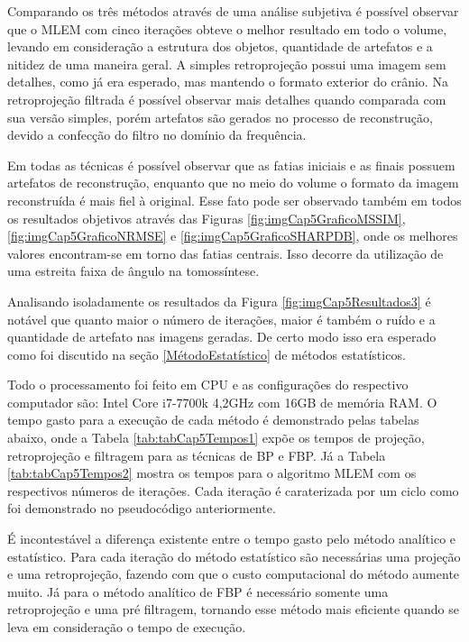 Comparando os três métodos através de uma análise subjetiva é possível observar que o \acs{MLEM} com cinco iterações obteve o melhor resultado em todo o volume, levando em consideração a estrutura dos objetos, quantidade de artefatos e a nitidez de uma maneira geral. A simples retroprojeção possui uma imagem sem detalhes, como já era esperado, mas mantendo o formato exterior do crânio. Na retroprojeção filtrada é possível observar mais detalhes quando comparada com sua versão simples, porém artefatos são gerados no processo de reconstrução, devido a confecção do filtro no domínio da frequência. 


Em todas as técnicas é possível observar que as fatias iniciais e as finais possuem artefatos de reconstrução, enquanto que no meio do volume o formato da imagem reconstruída é mais fiel à original. Esse fato pode ser observado também em todos os resultados objetivos através das Figuras \ref{fig:imgCap5GraficoMSSIM}, \ref{fig:imgCap5GraficoNRMSE} e \ref{fig:imgCap5GraficoSHARPDB}, onde os melhores valores encontram-se em torno das fatias centrais. Isso decorre da utilização de uma estreita faixa de ângulo na tomossíntese. 

Analisando isoladamente os resultados da Figura \ref{fig:imgCap5Resultados3} é notável que quanto maior o número de iterações, maior é também o ruído e a quantidade de artefato nas imagens geradas. De certo modo isso era esperado como foi discutido na seção \ref{MétodoEstatístico} de métodos estatísticos.       

Todo o processamento foi feito em \acs{CPU} e as configurações do respectivo computador são: Intel Core i7-7700k 4,2GHz com 16GB de memória RAM. O tempo gasto para a execução de cada método é demonstrado pelas tabelas abaixo, onde a Tabela \ref{tab:tabCap5Tempos1} expõe os tempos de projeção, retroprojeção e filtragem para as técnicas de \acs{BP} e \acs{FBP}. Já a Tabela \ref{tab:tabCap5Tempos2} mostra os tempos para o algoritmo \acs{MLEM} com os respectivos números de iterações. Cada iteração é caraterizada por um ciclo como foi demonstrado no pseudocódigo anteriormente.

É incontestável a diferença existente entre o tempo gasto pelo método analítico e estatístico. Para cada iteração do método estatístico são necessárias uma projeção e uma retroprojeção, fazendo com que o custo computacional do método aumente muito. Já para o método analítico de \acs{FBP} é necessário somente uma retroprojeção e uma pré filtragem, tornando esse método mais eficiente quando se leva em consideração o tempo de execução. 


